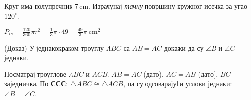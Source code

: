 \documentclass[11pt,a5paper,twoside,addpoints,answers]{exam}
\newcommand{\measure}[2]{#1\,\mathrm{#2}}
\newcommand{\variant}[3]{#1}
\begin{document}
\begin{questions}
\ifprintanswers\else\newpage\fi

\question[4]
\variant{
Круг има полупречник $\measure{7}{cm}$. Израчунај \emph{тачну} површину кружног исечка за угао $120^\circ$.
}{
Круг има полупречник $\measure{8}{cm}$. Израчунај \emph{тачну} дужину лука за угао $135^\circ$.
}{
Круг има полупречник $\measure{6}{cm}$. Израчунај \emph{тачну} дужину лука за угао $30^\circ$.
}
\begin{solution}[\stretch 3]
\variant{
$P_{is}=\frac{120}{360}\pi r^2=\frac{1}{3}\pi\cdot 49=\frac{49}{3}\pi\ \mathrm{cm}^2$
}{
$l=\frac{135}{360}\cdot 2\pi r=\frac{3}{8}\cdot 16\pi=6\pi\ \mathrm{cm}$
}{
$l=\frac{30}{360}\cdot 2\pi r=\frac{1}{12}\cdot 12\pi=\pi\ \mathrm{cm}$.
}
\end{solution}

\question[3]
\variant{
(Доказ) У једнакокраком троуглу $ABC$ са $AB=AC$ докажи да су $\angle B$ и $\angle C$ једнаки.
}{
(Доказ) У кружници нормала из центра на тетиву пресеца тетиву на половине.
}{
(Доказ) У једнакокраком троуглу $ABC$ ($AB=AC$) медијана $AM$ на основу $BC$ је уједно и нормала и симетрала угла при $A$.
}
\begin{solution}[\stretch 3]
\variant{
Посматрај троуглове $ABC$ и $ACB$.
$AB=AC$ (дато), $AC=AB$ (дато), $BC$ заједничка.
По \textbf{ССС}: $\triangle ABC\cong\triangle ACB$, па су одговарајући углови једнаки: $\angle B=\angle C$.
}{
Нека је $O$ центар, $AB$ тетива и $H$ подножје нормале $OH$ на $AB$.
Троуглови $OHA$ и $OHB$ су прави, имају $OH$ заједничку катету и $OA=OB$ (полупречници). По \textbf{ССС} су подударни, па је $HA=HB$.
}{
Нека је $M$ средиште $BC$. Троуглови $ABM$ и $ACM$ имају $AB=AC$ (дато), $BM=CM$ (дефиниција средишта), $AM$ заједничку. По \textbf{ССС} су подударни, па су $\angle AMB=\angle AMC$ (прави — збир $180^\circ$ и једнаки), те је $AM\perp BC$, а такође $\angle BAM=\angle MAC$ — $AM$ је симетрала угла.
}
\end{solution}

\ifprintanswers\else\newpage\fi


\end{questions}
\end{document}
